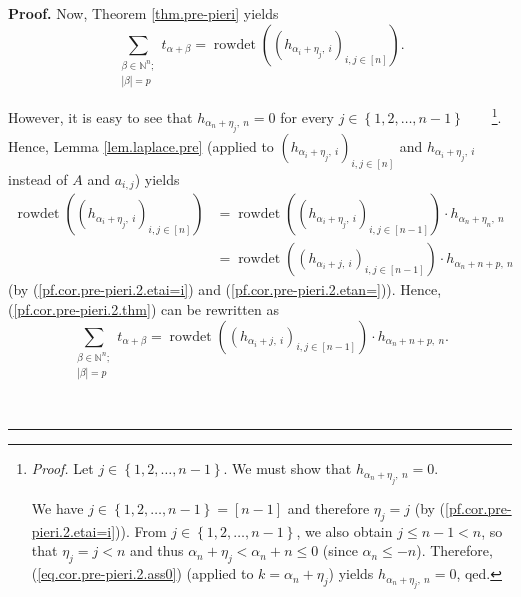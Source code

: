 \documentclass
[numbers=enddot,12pt,final,onecolumn,notitlepage,english]{scrartcl}%
\theoremstyle{definition}
\newenvironment{proof}[1][Proof]{\noindent\textbf{#1.} }{\ \rule{0.5em}{0.5em}}
\let\sumnonlimits\sum
\renewcommand{\sum}{\sumnonlimits\limits}
\newenvironment{vershort}{}{}
\begin{document}
\begin{proof}
Now, Theorem \ref{thm.pre-pieri} yields%
\begin{equation}
\sum_{\substack{\beta\in\mathbb{N}^{n};\\\left\vert \beta\right\vert
=p}}t_{\alpha+\beta}=\operatorname*{rowdet}\left(  \left(  h_{\alpha_{i}%
+\eta_{j},\ i}\right)  _{i,j\in\left[  n\right]  }\right)  .
\label{pf.cor.pre-pieri.2.thm}%
\end{equation}


\begin{vershort}
However, it is easy to see that $h_{\alpha_{n}+\eta_{j},\ n}=0$ for every
$j\in\left\{  1,2,\ldots,n-1\right\}  $\ \ \ \ \footnote{\textit{Proof.} Let
$j\in\left\{  1,2,\ldots,n-1\right\}  $. We must show that $h_{\alpha_{n}%
+\eta_{j},\ n}=0$.
\par
We have $j\in\left\{  1,2,\ldots,n-1\right\}  =\left[  n-1\right]  $ and
therefore $\eta_{j}=j$ (by (\ref{pf.cor.pre-pieri.2.etai=i})). From
$j\in\left\{  1,2,\ldots,n-1\right\}  $, we also obtain $j\leq n-1<n$, so that
$\eta_{j}=j<n$ and thus $\alpha_{n}+\eta_{j}<\alpha_{n}+n\leq0$ (since
$\alpha_{n}\leq-n$). Therefore, (\ref{eq.cor.pre-pieri.2.ass0}) (applied to
$k=\alpha_{n}+\eta_{j}$) yields $h_{\alpha_{n}+\eta_{j},\ n}=0$, qed.}. Hence,
Lemma \ref{lem.laplace.pre} (applied to $\left(  h_{\alpha_{i}+\eta_{j}%
,\ i}\right)  _{i,j\in\left[  n\right]  }$ and $h_{\alpha_{i}+\eta_{j},\ i}$
instead of $A$ and $a_{i,j}$) yields%
\begin{align*}
\operatorname*{rowdet}\left(  \left(  h_{\alpha_{i}+\eta_{j},\ i}\right)
_{i,j\in\left[  n\right]  }\right)   &  =\operatorname*{rowdet}\left(  \left(
h_{\alpha_{i}+\eta_{j},\ i}\right)  _{i,j\in\left[  n-1\right]  }\right)
\cdot h_{\alpha_{n}+\eta_{n},\ n}\\
&  =\operatorname*{rowdet}\left(  \left(  h_{\alpha_{i}+j,\ i}\right)
_{i,j\in\left[  n-1\right]  }\right)  \cdot h_{\alpha_{n}+n+p,\ n}%
\end{align*}
(by (\ref{pf.cor.pre-pieri.2.etai=i}) and (\ref{pf.cor.pre-pieri.2.etan=})).
Hence, (\ref{pf.cor.pre-pieri.2.thm}) can be rewritten as%
\[
\sum_{\substack{\beta\in\mathbb{N}^{n};\\\left\vert \beta\right\vert
=p}}t_{\alpha+\beta}=\operatorname*{rowdet}\left(  \left(  h_{\alpha
_{i}+j,\ i}\right)  _{i,j\in\left[  n-1\right]  }\right)  \cdot h_{\alpha
_{n}+n+p,\ n}.
\]

\end{vershort}


\end{proof}
\end{document}
